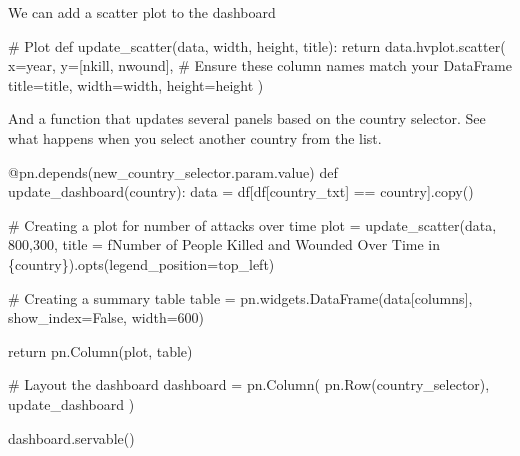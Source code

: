 \documentclass[
  letterpaper,
  DIV=11,
  numbers=noendperiod]{scrreprt}
\newenvironment{Shaded}{\begin{snugshade}}{\end{snugshade}}
\newcommand{\AttributeTok}[1]{\textcolor[rgb]{0.40,0.45,0.13}{#1}}
\newcommand{\CommentTok}[1]{\textcolor[rgb]{0.37,0.37,0.37}{#1}}
\newcommand{\ControlFlowTok}[1]{\textcolor[rgb]{0.00,0.23,0.31}{#1}}
\newcommand{\DecValTok}[1]{\textcolor[rgb]{0.68,0.00,0.00}{#1}}
\newcommand{\KeywordTok}[1]{\textcolor[rgb]{0.00,0.23,0.31}{#1}}
\newcommand{\NormalTok}[1]{\textcolor[rgb]{0.00,0.23,0.31}{#1}}
\newcommand{\OperatorTok}[1]{\textcolor[rgb]{0.37,0.37,0.37}{#1}}
\newcommand{\SpecialCharTok}[1]{\textcolor[rgb]{0.37,0.37,0.37}{#1}}
\newcommand{\SpecialStringTok}[1]{\textcolor[rgb]{0.13,0.47,0.30}{#1}}
\newcommand{\StringTok}[1]{\textcolor[rgb]{0.13,0.47,0.30}{#1}}
\newcommand{\VariableTok}[1]{\textcolor[rgb]{0.07,0.07,0.07}{#1}}
\begin{document}
We can add a scatter plot to the dashboard

\begin{Shaded}
\begin{Highlighting}[]
\CommentTok{\# Plot}
\KeywordTok{def}\NormalTok{ update\_scatter(data, width, height, title):}
        \ControlFlowTok{return}\NormalTok{ data.hvplot.scatter(}
\NormalTok{        x}\OperatorTok{=}\StringTok{\textquotesingle{}year\textquotesingle{}}\NormalTok{, }
\NormalTok{        y}\OperatorTok{=}\NormalTok{[}\StringTok{\textquotesingle{}nkill\textquotesingle{}}\NormalTok{, }\StringTok{\textquotesingle{}nwound\textquotesingle{}}\NormalTok{],  }\CommentTok{\# Ensure these column names match your DataFrame}
\NormalTok{        title}\OperatorTok{=}\NormalTok{title,}
\NormalTok{        width}\OperatorTok{=}\NormalTok{width,}
\NormalTok{        height}\OperatorTok{=}\NormalTok{height}
\NormalTok{    )}
\end{Highlighting}
\end{Shaded}

And a function that updates several panels based on the country
selector. See what happens when you select another country from the
list.

\begin{Shaded}
\begin{Highlighting}[]
\AttributeTok{@pn.depends}\NormalTok{(new\_country\_selector.param.value)}
\KeywordTok{def}\NormalTok{ update\_dashboard(country):}
\NormalTok{    data }\OperatorTok{=}\NormalTok{ df[df[}\StringTok{\textquotesingle{}country\_txt\textquotesingle{}}\NormalTok{] }\OperatorTok{==}\NormalTok{ country].copy()}
    
    \CommentTok{\# Creating a plot for number of attacks over time}
\NormalTok{    plot }\OperatorTok{=}\NormalTok{ update\_scatter(data, }\DecValTok{800}\NormalTok{,}\DecValTok{300}\NormalTok{, }
\NormalTok{                          title }\OperatorTok{=} \SpecialStringTok{f\textquotesingle{}Number of People Killed and Wounded Over Time in }\SpecialCharTok{\{}\NormalTok{country}\SpecialCharTok{\}}\SpecialStringTok{\textquotesingle{}}\NormalTok{).opts(legend\_position}\OperatorTok{=}\StringTok{\textquotesingle{}top\_left\textquotesingle{}}\NormalTok{)}
    
    \CommentTok{\# Creating a summary table}
\NormalTok{    table }\OperatorTok{=}\NormalTok{ pn.widgets.DataFrame(data[columns], show\_index}\OperatorTok{=}\VariableTok{False}\NormalTok{, width}\OperatorTok{=}\DecValTok{600}\NormalTok{)}
    
    \ControlFlowTok{return}\NormalTok{ pn.Column(plot, table)}

\CommentTok{\# Layout the dashboard}
\NormalTok{dashboard }\OperatorTok{=}\NormalTok{ pn.Column(}
\NormalTok{    pn.Row(country\_selector),}
\NormalTok{    update\_dashboard}
\NormalTok{)}

\NormalTok{dashboard.servable()}
\end{Highlighting}
\end{Shaded}
\end{document}
